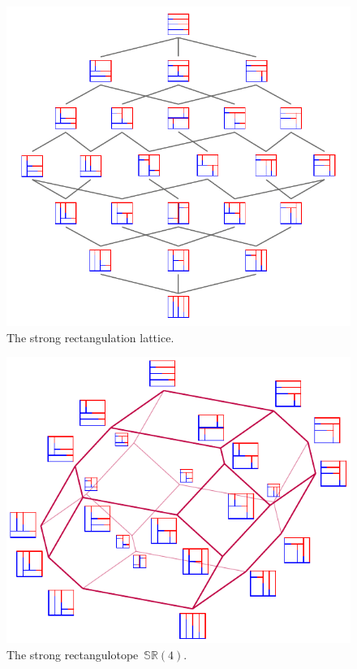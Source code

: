 \documentclass{amsart}
\theoremstyle{definition}
\newcommand{\polytope}[1]{\mathds{#1}} %
\newcommand{\SRP}{\polytope{SR}} %
\begin{document}
\begin{figure}
	\centerline{\includegraphics[scale=1.05]{strongRectangulationLattice}}
	\caption{The strong rectangulation lattice.}
	\label{fig:strongRectangulationLattice}
\end{figure}
\begin{figure}
	\centerline{\includegraphics[scale=1.05]{strongRectangulotopeLabeled}}
	\caption{The strong rectangulotope~$\SRP(4)$.}
        \label{fig:strongRectangulotope}
\end{figure}
\end{document}
